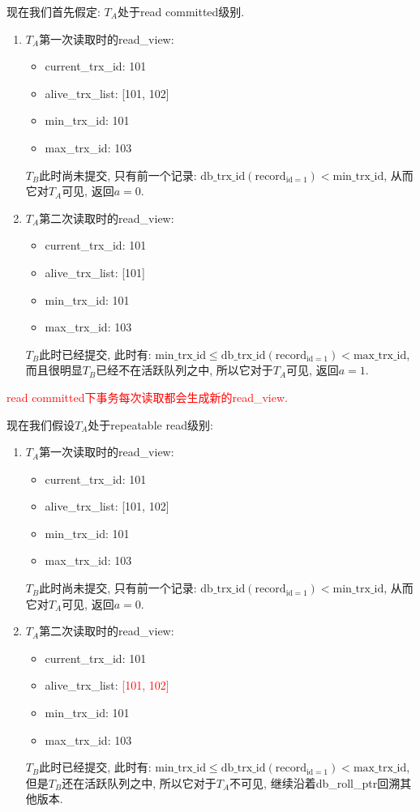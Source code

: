 现在我们首先假定: $T_A$处于read committed级别.

\begin{enumerate}
    \item $T_A$第一次读取时的read\_view:
    \begin{itemize}
      \item current\_trx\_id: 101
      \item alive\_trx\_list: [101, 102]
      \item min\_trx\_id: 101
      \item max\_trx\_id: 103
    \end{itemize}
    $T_B$此时尚未提交, 只有前一个记录: $\text{db\_trx\_id}(\text{record}_{\text{id}=1})<\text{min\_trx\_id}$, 从而它对$T_A$可见, 返回$a=0$.
    \item $T_A$第二次读取时的read\_view:
    \begin{itemize}
      \item current\_trx\_id: 101
      \item alive\_trx\_list: [101]
      \item min\_trx\_id: 101
      \item max\_trx\_id: 103
    \end{itemize}
    $T_B$此时已经提交, 此时有: $\text{min\_trx\_id}\leq \text{db\_trx\_id}(\text{record}_{\text{id}=1})<\text{max\_trx\_id}$, 而且很明显$T_B$已经不在活跃队列之中, 所以它对于$T_A$可见, 返回$a=1$.
\end{enumerate}

\textcolor{red}{read committed下事务每次读取都会生成新的read\_view.}

现在我们假设$T_A$处于repeatable read级别:
\begin{enumerate}
    \item $T_A$第一次读取时的read\_view:
    \begin{itemize}
      \item current\_trx\_id: 101
      \item alive\_trx\_list: [101, 102]
      \item min\_trx\_id: 101
      \item max\_trx\_id: 103
    \end{itemize}
    $T_B$此时尚未提交, 只有前一个记录: $\text{db\_trx\_id}(\text{record}_{\text{id}=1})<\text{min\_trx\_id}$, 从而它对$T_A$可见, 返回$a=0$.
    \item $T_A$第二次读取时的read\_view:
    \begin{itemize}
      \item current\_trx\_id: 101
      \item alive\_trx\_list: \textcolor{red}{[101, 102]}
      \item min\_trx\_id: 101
      \item max\_trx\_id: 103
    \end{itemize}
    $T_B$此时已经提交, 此时有: $\text{min\_trx\_id}\leq \text{db\_trx\_id}(\text{record}_{\text{id}=1})<\text{max\_trx\_id}$, 但是$T_B$还在活跃队列之中, 所以它对于$T_A$不可见, 继续沿着db\_roll\_ptr回溯其他版本.
\end{enumerate}

